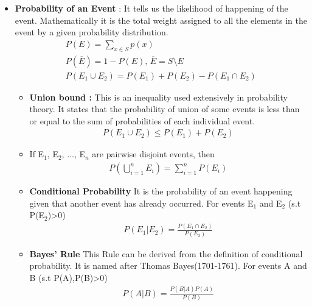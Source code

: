 \documentclass[12pt]{article}
\begin{document}
\begin{itemize}
    \item \textbf{Probability of an Event} : It tells us the likelihood of happening of the event. Mathematically it is the total weight assigned to all the elements in the
    event by a given probability distribution.
    \begin{gather*}
        P(E) = \sum_{x\in S} p(x) \\
        P(\overline{E}) = 1-P(E) , \hspace{2pt} \overline{E} = S \setminus  E\\
        P(E_{1}\cup E_{2}) = P(E_{1}) + P(E_{2}) - P(E_{1}\cap E_{2})
    \end{gather*}
    
    \begin{itemize}
        \item \textbf{Union bound :} This is an inequality used extensively in probability theory. It states that the probability of union of some events is less than or equal to the sum of probabilities of each individual event.
        \begin{gather*}
            P(E_{1}\cup E_{2}) \leq P(E_{1}) + P(E_{2})
        \end{gather*}
    
    
        \item If E$_{1}$, E$_{2}$, $\ldots$, E$_{n}$ are pairwise disjoint events, then
        \begin{gather*}
            P(\bigcup_{i=1}^{n} E_{i}) = \sum_{i=1}^{n} P(E_i)
        \end{gather*}
        
        \item \textbf{Conditional Probability} It is the probability of an event happening given that another event has already occurred. For events E$_{1}$ and E$_{2}$ (s.t P(E$_{2}$)>0)
        \begin{gather*}
            P(E_{1}|E_{2}) = \frac{P(E_{1}\cap E_{2})}{P(E_{2})}
        \end{gather*}
        
        \item \textbf{Bayes' Rule} This Rule can be derived from the definition of conditional probability. It is named after Thomas Bayes(1701-1761). For events A and B (s.t P(A),P(B)>0)
        \begin{gather*}
            P(A|B) = \frac{P(B|A)P(A)}{P(B)}
        \end{gather*}
    \end{itemize}
\end{itemize}
\end{document}
